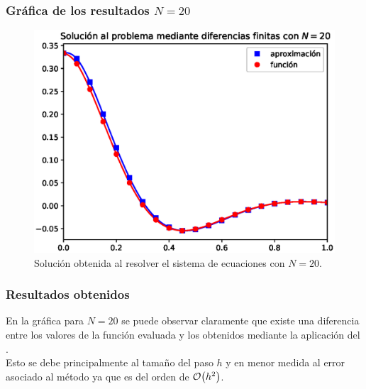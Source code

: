 \begin{frame}
\frametitle{Gráfica de los resultados $N=20$}
\begin{figure}[h!]
    \centering
    \includegraphics[scale=0.5]{Imagenes/metodo_diferencias_finitas_06.eps}
    \caption{Solución obtenida al resolver el sistema de ecuaciones con $N=20$.}
\end{figure}
\end{frame}
\begin{frame}
\frametitle{Resultados obtenidos}
En la gráfica para $N=20$ se puede observar claramente que existe una diferencia entre los valores de la función evaluada y los obtenidos mediante la aplicación del .
\\
\bigskip
Esto se debe principalmente al tamaño del paso $h$ y en menor medida al error asociado al método ya que es del orden de $\order{h^{2}}$.
\end{frame}

